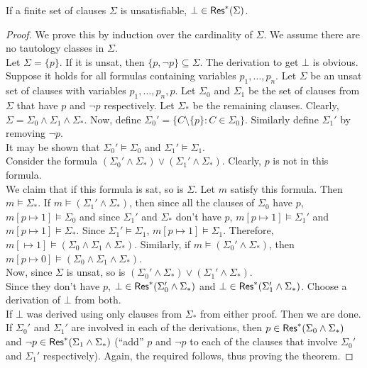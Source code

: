 \begin{theorem}
	If a finite set of clauses $\Sigma$ is unsatisfiable, $\bot\in\mathsf{Res}^*(\Sigma)$.
\end{theorem}
\begin{proof}
	We prove this by induction over the cardinality of $\Sigma$. We assume there are no tautology classes in $\Sigma$.\\
	Let $\Sigma=\{p\}$. If it is unsat, then $\{p,\neg p\}\subseteq\Sigma$. The derivation to get $\bot$ is obvious.\\
	Suppose it holds for all formulas containing variables $p_1,\ldots,p_n$. Let $\Sigma$ be an unsat set of clauses with variables $p_1,\ldots,p_n,p$. Let $\Sigma_0$ and $\Sigma_1$ be the set of clauses from $\Sigma$ that have $p$ and $\neg p$ respectively. Let $\Sigma_*$ be the remaining clauses. Clearly, $\Sigma=\Sigma_0\land\Sigma_1\land\Sigma_*$. Now, define $\Sigma_0'=\{C\setminus\{p\} : C\in\Sigma_0\}$. Similarly define $\Sigma_1'$ by removing $\neg p$.\\
	It may be shown that $\Sigma_0'\vDash\Sigma_0$ and $\Sigma_1'\vDash\Sigma_1$.\\

	Consider the formula $(\Sigma_0'\land\Sigma_*)\lor(\Sigma_1'\land\Sigma_*)$. Clearly, $p$ is not in this formula.\\
	We claim that if this formula is sat, so is $\Sigma$. Let $m$ satisfy this formula. Then $m\vDash\Sigma_*$. If $m\vDash(\Sigma_1'\land\Sigma_*)$, then since all the clauses of $\Sigma_0$ have $p$, $m[p\mapsto 1]\vDash\Sigma_0$ and since $\Sigma_1'$ and $\Sigma_*$ don't have $p$, $m[p\mapsto 1]\vDash\Sigma_1'$ and $m[p\mapsto 1]\vDash\Sigma_*$. Since $\Sigma_1'\vDash\Sigma_1$, $m[p\mapsto 1]\vDash\Sigma_1$. Therefore, $m[\mapsto 1]\vDash (\Sigma_0\land\Sigma_1\land\Sigma_*)$. Similarly, if $m\vDash(\Sigma_0'\land\Sigma_*)$, then $m[p\mapsto 0]\vDash(\Sigma_0\land\Sigma_1\land\Sigma_*)$.\\
	Now, since $\Sigma$ is unsat, so is $(\Sigma_0'\land\Sigma_*)\lor(\Sigma_1'\land\Sigma_*)$.\\

	Since they don't have $p$, $\bot\in\mathsf{Res}^*(\Sigma_0'\wedge\Sigma_*)$ and $\bot\in\mathsf{Res}^*(\Sigma_1'\wedge\Sigma_*)$. Choose a derivation of $\bot$ from both.\\
	If $\bot$ was derived using only clauses from $\Sigma_*$ from either proof. Then we are done.\\
	If $\Sigma_0'$ and $\Sigma_1'$ are involved in each of the derivations, then $p\in\mathsf{Res}^*(\Sigma_0\wedge\Sigma_*)$ and $\neg p\in\mathsf{Res}^*(\Sigma_1\wedge\Sigma_*)$ (``add'' $p$ and $\neg p$ to each of the clauses that involve $\Sigma_0'$ and $\Sigma_1'$ respectively). Again, the required follows, thus proving the theorem.
\end{proof}

